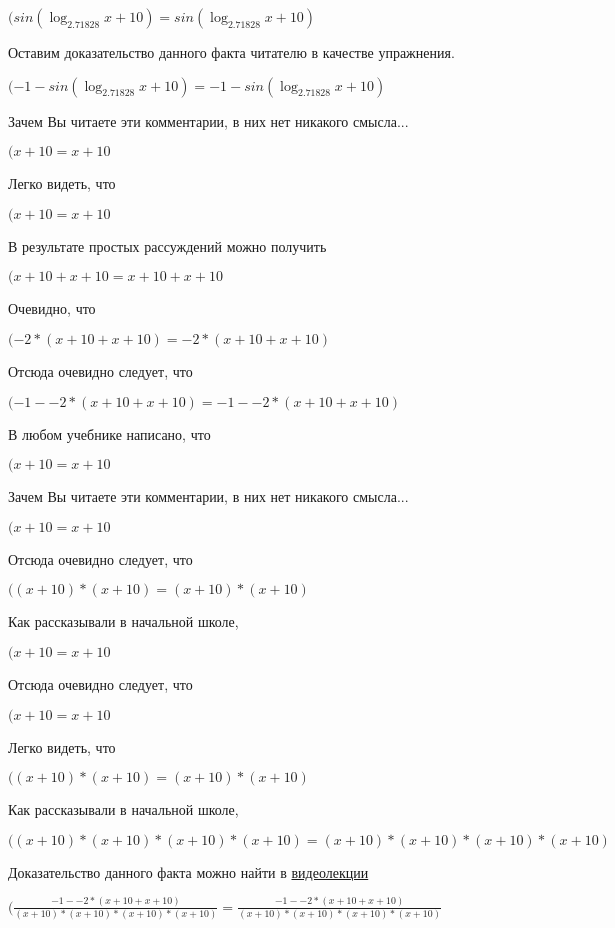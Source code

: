 \documentclass[12pt,a4paper,fleqn]{article}
\theoremstyle{definition}
\begin{document}
$(sin(\log_{ 2.71828 }{ x  +  10 }) = sin(\log_{ 2.71828 }{ x  +  10 })$

Оставим доказательство данного факта читателю в качестве упражнения.

$( -1  - sin(\log_{ 2.71828 }{ x  +  10 }) =  -1  - sin(\log_{ 2.71828 }{ x  +  10 })$

Зачем Вы читаете эти комментарии, в них нет никакого смысла...

$( x  +  10  =  x  +  10 $

Легко видеть, что

$( x  +  10  =  x  +  10 $

В результате простых рассуждений можно получить

$( x  +  10  +  x  +  10  =  x  +  10  +  x  +  10 $

Очевидно, что

$( -2  * ( x  +  10  +  x  +  10 ) =  -2  * ( x  +  10  +  x  +  10 )$

Отсюда очевидно следует, что

$( -1  -  -2  * ( x  +  10  +  x  +  10 ) =  -1  -  -2  * ( x  +  10  +  x  +  10 )$

В любом учебнике написано, что

$( x  +  10  =  x  +  10 $

Зачем Вы читаете эти комментарии, в них нет никакого смысла...

$( x  +  10  =  x  +  10 $

Отсюда очевидно следует, что

$(( x  +  10 ) * ( x  +  10 ) = ( x  +  10 ) * ( x  +  10 )$

Как рассказывали в начальной школе,

$( x  +  10  =  x  +  10 $

Отсюда очевидно следует, что

$( x  +  10  =  x  +  10 $

Легко видеть, что

$(( x  +  10 ) * ( x  +  10 ) = ( x  +  10 ) * ( x  +  10 )$

Как рассказывали в начальной школе,

$(( x  +  10 ) * ( x  +  10 ) * ( x  +  10 ) * ( x  +  10 ) = ( x  +  10 ) * ( x  +  10 ) * ( x  +  10 ) * ( x  +  10 )$

Доказательство данного факта можно найти в \href{https://www.youtube.com/watch?v=dQw4w9WgXcQ}{видеолекции}

$(\frac{ -1  -  -2  * ( x  +  10  +  x  +  10 )}{( x  +  10 ) * ( x  +  10 ) * ( x  +  10 ) * ( x  +  10 )}
 = \frac{ -1  -  -2  * ( x  +  10  +  x  +  10 )}{( x  +  10 ) * ( x  +  10 ) * ( x  +  10 ) * ( x  +  10 )}
$
\end{document}
